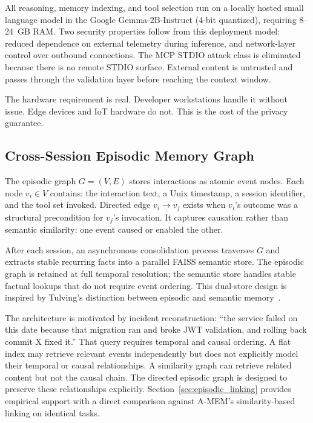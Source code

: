 \documentclass[sigconf]{acmart}
\begin{document}
All reasoning, memory indexing, and tool selection run on a locally
hosted small language model in the Google Gemma-2B-Instruct (4-bit quantized), requiring
8--24~GB RAM. Two security properties follow from this deployment model: reduced dependence on external telemetry during inference, and network-layer control over outbound connections. The MCP STDIO attack class is eliminated because there is
no remote STDIO surface. External content is untrusted and passes through
the validation layer before reaching the context window.

The hardware requirement is real. Developer workstations handle it without
issue. Edge devices and IoT hardware do not. This is the cost of the
privacy guarantee.

\subsection{Cross-Session Episodic Memory Graph}
\label{sec:episodic_arch}

The episodic graph $G=(V,E)$ stores interactions as atomic event nodes.
Each node $v_i \in V$ contains: the interaction text, a Unix timestamp,
a session identifier, and the tool set invoked. Directed edge
$v_i \to v_j$ exists when $v_i$'s outcome was a structural precondition
for $v_j$'s invocation. It captures causation rather than semantic
similarity: one event caused or enabled the other.

After each session, an asynchronous consolidation process traverses $G$
and extracts stable recurring facts into a parallel FAISS semantic store.
The episodic graph is retained at full temporal resolution; the semantic
store handles stable factual lookups that do not require event ordering.
This dual-store design is inspired by Tulving's distinction between episodic and semantic memory~\cite{tulving1972}.

The architecture is motivated by incident reconstruction: ``the service
failed on this date because that migration ran and broke JWT validation,
and rolling back commit X fixed it.'' That query requires temporal and
causal ordering. A flat index may retrieve relevant events independently but does not explicitly model their temporal or causal relationships. A similarity graph can
retrieve related content but not the causal chain. The directed episodic graph is designed to preserve these relationships explicitly. Section~\ref{sec:episodic_linking} provides empirical support with a direct comparison against A-MEM's similarity-based
linking on identical tasks.
\end{document}
